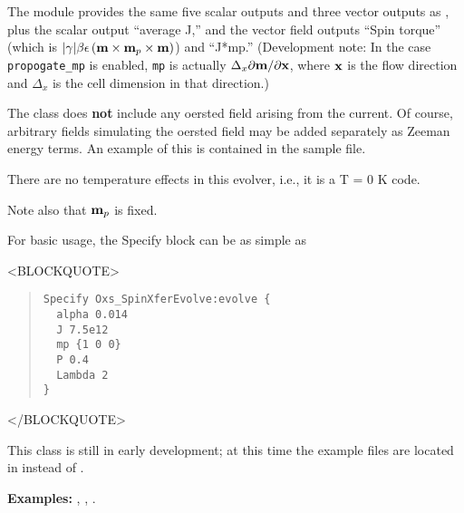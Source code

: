 \begin{description}
The  module provides the same five scalar
outputs and three vector outputs as , plus the
scalar output ``average J,'' and the vector field outputs ``Spin
torque'' (which is
$|\gamma|\beta\epsilon\left(\textbf{m}\times\textbf{m}_p\times\textbf{m}\right)$) and
``J*mp.''  (Development note: In the case \texttt{propogate\_mp} is
enabled, \texttt{mp} is actually $\Delta_x\partial\textbf{m}/\partial\textbf{x}$,
where $\textbf{x}$ is the flow direction and $\Delta_x$ is the cell dimension
in that direction.)

The  class does \textbf{not} include any oersted
field arising from the current.  Of course, arbitrary fields simulating
the oersted field may be added separately as Zeeman energy terms.  An
example of this is contained in the  sample file.

There are no temperature effects in this evolver, i.e., it is a T = 0 K
code.

Note also that $\textbf{m}_p$ is fixed.

For basic usage, the Specify block can be as simple as
\begin{rawhtml}<BLOCKQUOTE>\end{rawhtml}
\begin{quote}
\begin{verbatim}
Specify Oxs_SpinXferEvolve:evolve {
  alpha 0.014
  J 7.5e12
  mp {1 0 0}
  P 0.4
  Lambda 2
}
\end{verbatim}
\end{quote}
\begin{rawhtml}</BLOCKQUOTE>\end{rawhtml}

This class is still in early development; at this time the example files
are located in  instead of
.

\textbf{Examples:} , ,
.


\end{description}
